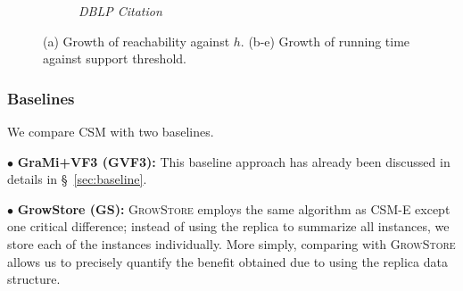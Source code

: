 \begin{figure}[tb!]
\begin{subfigure}[b]{0.21\textwidth}
		\caption{ {\em DBLP Citation}}
		\label{fig:citationdblp_h1}
	\end{subfigure}%
	\caption{(a) Growth of reachability against $h$. (b-e) Growth of running time against support threshold.}
	\label{fig:baseline_comp}
	\vspace{-1mm}
\end{figure}
%
\vspace{-0.1in}
\subsubsection{Baselines} We compare {\sf CSM} with two baselines. %
%

$\bullet$ \textbf{GraMi+VF3 (GVF3):} This baseline approach has already been discussed in details in \S~\ref{sec:baseline}. %
%

$\bullet$ \textbf{GrowStore (GS):} \textsc{GrowStore} \cite{KK04} employs the same algorithm as {\sf CSM-E} except one critical difference; instead of using the replica to summarize all instances, we store each of the instances individually. More simply, comparing with \textsc{GrowStore} allows us to precisely quantify the benefit obtained due to using the replica data structure.
%
\vspace{-0.1in}

